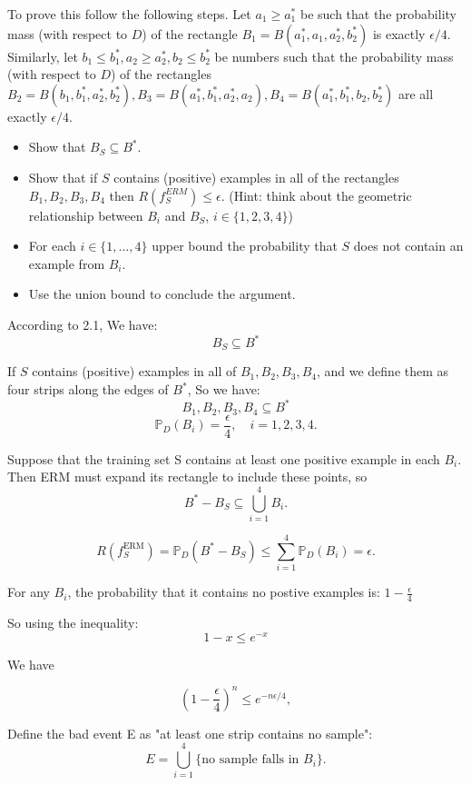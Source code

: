     To prove this follow the following steps. Let $a_1 \ge a_1^*$ be such that the probability mass (with respect to $D$) of the rectangle $B_1=B(a_1^*, a_1, a_2^*, b_2^*)$ is exactly $\epsilon/4$. Similarly, let $b_1\leq b_1^*, a_2\geq a_2^*,b_2\leq b_2^*$ be numbers such that the probability mass (with respect to $D$) of the rectangles $B_2=B(b_1,b_1^*, a_2^*, b_2^*), B_3=B(a_1^*, b_1^*, a_2^*, a_2), B_4=B(a_1^*, b_1^*, b_2, b_2^*)$ are all exactly $\epsilon/4$.
    \begin{itemize}
        \item Show that $B_S \subseteq B^*$.
        \item Show that if $S$ contains (positive) examples in all of the rectangles $B_1, B_2, B_3, B_4$ then $R(f_S^{ERM})\le \epsilon$. (Hint: think about the geometric relationship between $B_i$ and $B_S$, $i\in\{1,2,3,4\}$)
        \item For each $i \in \{1,\dots, 4\}$ upper bound the probability that $S$ does not contain an example from $B_i$.
        \item Use the union bound to conclude the argument.
    \end{itemize}


According to 2.1, We have:
\[
B_S \subseteq B^*
\]

If $S$ contains (positive) examples in all of $B_1, B_2, B_3, B_4$, and we define them as four strips along the edges of $B^*$, So we have:
\[
B_1, B_2, B_3, B_4 \subseteq B^*
\]
\[
\mathbb{P}_D(B_i) = \frac{\epsilon}{4}, \quad i=1,2,3,4.
\]

Suppose that the training set S contains at least one positive example in each $B_i$. Then ERM must expand its rectangle to include these points, so
\[
B^*-B_S \subseteq \bigcup_{i=1}^4 B_i.
\]

\[
R(f_S^{\mathrm{ERM}}) = \mathbb{P}_D(B^* - B_S) \le \sum_{i=1}^4 \mathbb{P}_D(B_i) = \epsilon.
\]

For any $B_i$, the probability that it contains no postive examples is: $1 - \frac{\epsilon}{4}$

So using the inequality:
\[
1-x \le e^{-x}
\]

We have 

\[
\left(1 - \frac{\epsilon}{4}\right)^n \le e^{-n \epsilon /4},
\]

Define the bad event E as "at least one strip contains no sample":
\[
E = \bigcup_{i=1}^4 \{\text{no sample falls in } B_i\}.
\]

